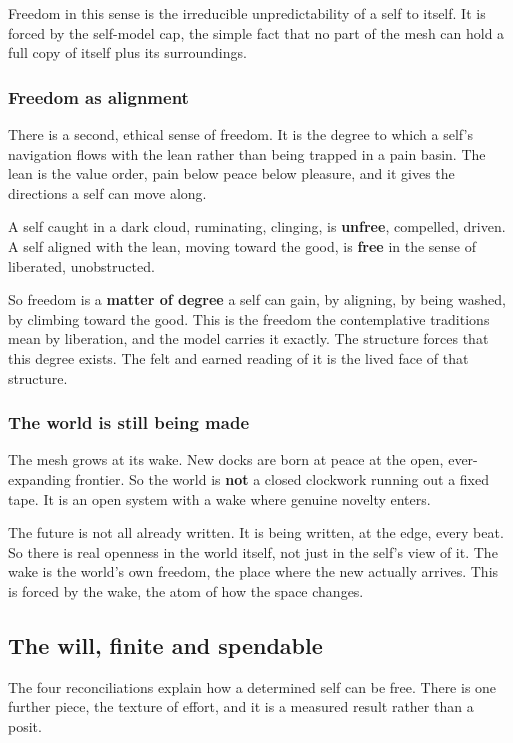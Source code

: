 Freedom in this sense is the irreducible unpredictability of a self to itself. It is forced by the self-model cap, the simple fact that no part of the mesh can hold a full copy of itself plus its surroundings.

\subsubsection{Freedom as alignment}

There is a second, ethical sense of freedom. It is the degree to which a self's navigation flows with the lean rather than being trapped in a pain basin. The lean is the value order, pain below peace below pleasure, and it gives the directions a self can move along.

A self caught in a dark cloud, ruminating, clinging, is \textbf{unfree}, compelled, driven. A self aligned with the lean, moving toward the good, is \textbf{free} in the sense of liberated, unobstructed.

So freedom is a \textbf{matter of degree} a self can gain, by aligning, by being washed, by climbing toward the good. This is the freedom the contemplative traditions mean by liberation, and the model carries it exactly. The structure forces that this degree exists. The felt and earned reading of it is the lived face of that structure.

\subsubsection{The world is still being made}

The mesh grows at its wake. New docks are born at peace at the open, ever-expanding frontier. So the world is \textbf{not} a closed clockwork running out a fixed tape. It is an open system with a wake where genuine novelty enters.

The future is not all already written. It is being written, at the edge, every beat. So there is real openness in the world itself, not just in the self's view of it. The wake is the world's own freedom, the place where the new actually arrives. This is forced by the wake, the atom of how the space changes.

\subsection{The will, finite and spendable}

The four reconciliations explain how a determined self can be free. There is one further piece, the texture of effort, and it is a measured result rather than a posit.

